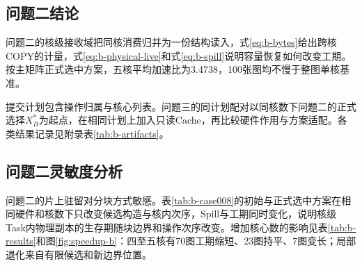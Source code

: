 \subsection{问题二结论}
问题二的核级接收域把同核消费归并为一份结构读入，式\eqref{eq:b-bytes}给出跨核COPY的计量，式\eqref{eq:b-physical-live}和式\eqref{eq:b-spill}说明容量恢复如何改变工期。按主矩阵正式选中方案，五核平均加速比为3.4738，100张图均不慢于整图单核基准。

提交计划包含操作归属与核心列表。问题三的同计划配对以同核数下问题二的正式选择$X_B^*$为起点，在相同计划上加入只读Cache，再比较硬件作用与方案适配。各类结果记录见附录表\ref{tab:b-artifacts}。

\subsection{问题二灵敏度分析}
问题二的片上驻留对分块方式敏感。表\ref{tab:b-case008}的初始与正式选中方案在相同硬件和核数下只改变候选构造与核内次序，Spill与工期同时变化，说明核级Task内物理副本的生存期随块边界和操作次序改变。增加核心数的影响见表\ref{tab:b-results}和图\ref{fig:speedup-b}：四至五核有70图工期缩短、23图持平、7图变长；局部退化来自有限候选和新边界位置。
